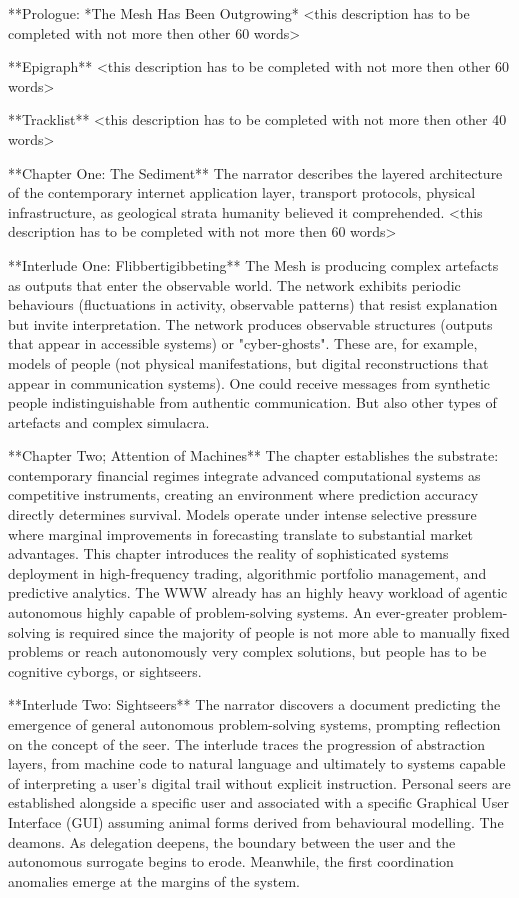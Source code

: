 
**Prologue: *The Mesh Has Been Outgrowing* <this description has to be completed with not more then other 60 words>

**Epigraph** <this description has to be completed with not more then other 60 words>

**Tracklist** <this description has to be completed with not more then other 40 words>

**Chapter One: The Sediment** The narrator describes the layered architecture of the contemporary internet application layer, transport protocols, physical infrastructure, as geological strata humanity believed it comprehended. <this description has to be completed with not more then 60 words>

**Interlude One: Flibbertigibbeting** The Mesh is producing complex artefacts as outputs that enter the observable world. The network exhibits periodic behaviours (fluctuations in activity, observable patterns) that resist explanation but invite interpretation. The network produces observable structures (outputs that appear in accessible systems) or "cyber-ghosts". These are, for example,  models of people (not physical manifestations, but digital reconstructions that appear in communication systems). One could receive messages from synthetic people indistinguishable from authentic communication. But also other types of artefacts and complex simulacra.

**Chapter Two; Attention of Machines** The chapter establishes the substrate: contemporary financial regimes integrate advanced computational systems as competitive instruments, creating an environment where prediction accuracy directly determines survival. Models operate under intense selective pressure where marginal improvements in forecasting translate to substantial market advantages. This chapter introduces the reality of sophisticated systems deployment in high-frequency trading, algorithmic portfolio management, and predictive analytics. The WWW already has an highly heavy workload of agentic autonomous highly capable of problem-solving systems. An ever-greater problem-solving is required since the majority of people is not more able to manually fixed problems or reach autonomously very complex solutions, but people has to be cognitive cyborgs, or sightseers.

**Interlude Two: Sightseers** The narrator discovers a document predicting the emergence of general autonomous problem-solving systems, prompting reflection on the concept of the seer. The interlude traces the progression of abstraction layers, from machine code to natural language and ultimately to systems capable of interpreting a user’s digital trail without explicit instruction. Personal seers are established alongside a specific user and associated with a specific Graphical User Interface (GUI) assuming animal forms derived from behavioural modelling. The deamons. As delegation deepens, the boundary between the user and the autonomous surrogate begins to erode. Meanwhile, the first coordination anomalies emerge at the margins of the system.

